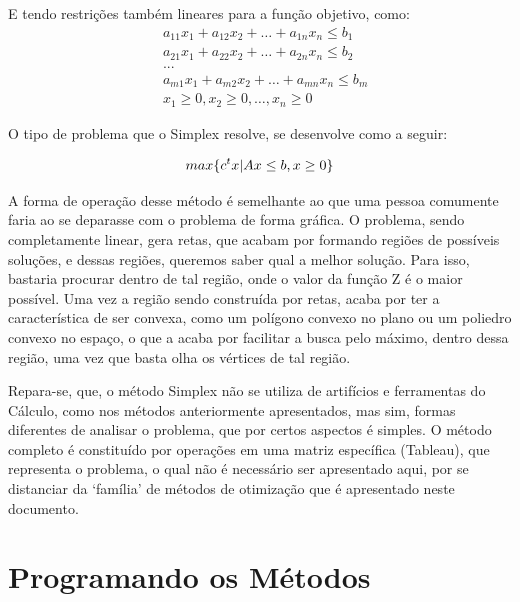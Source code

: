 E tendo restrições também lineares para a função objetivo, como:
\begin{equation}
    \begin{split}
        &   a_{11}x_1 + a_{12}x_2 + … + a_{1n}x_n \leq b_1\\
        &   a_{21}x_1 + a_{22}x_2 + … + a_{2n}x_n \leq b_2\\
        &   ...\\
        &   a_{m1}x_1 + a_{m2}x_2 + … + a_{mn}x_n \leq b_m\\
        &   x_1 \geq 0, x_2 \geq 0, …, x_n \geq 0
    \end{split}
\end{equation}

O tipo de problema que o Simplex resolve, se desenvolve como a seguir:

\begin{equation}
        max \{c^tx | Ax \leq b, x \geq 0\}\\
\end{equation}


A forma de operação desse método é semelhante ao que uma pessoa comumente faria
ao se deparasse com o problema de forma gráfica. O problema, sendo
completamente linear, gera retas, que acabam por formando regiões de
possíveis soluções, e dessas regiões, queremos saber qual a melhor solução.
Para isso, bastaria procurar dentro de tal região, onde o valor da função Z é o
maior possível. Uma vez a região sendo construída por retas, acaba por
ter a característica de ser convexa, como um polígono convexo no plano ou um
poliedro convexo no espaço, o que a acaba por facilitar a busca pelo máximo,
dentro dessa região, uma vez que basta olha os vértices de tal região.

Repara-se, que, o método Simplex não se utiliza de artifícios e ferramentas do
Cálculo, como nos métodos anteriormente apresentados, mas sim, formas
diferentes de analisar o problema, que por certos aspectos é simples. O método
completo é constituído por operações em uma matriz específica (Tableau), que
representa o problema, o qual não é necessário ser apresentado aqui, por se
distanciar da `família' de métodos de otimização que é apresentado neste
documento.



\section{{Programando os Métodos}}

\hspace{0.8cm}

